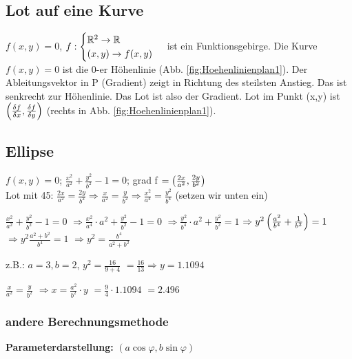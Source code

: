 \renewcommand{\ldate}{2015-11-19}

\subsection{Lot auf eine Kurve}
$f(x,y) = 0$, $f: \begin{cases}
\mathbb{R}^2 \rightarrow \mathbb{R} \\
(x,y) \rightarrow f(x,y)
\end{cases}$ ist ein \glqq Funktionsgebirge\grqq. Die Kurve $f(x,y)=0$ ist die 0-er Höhenlinie (Abb. \ref{fig:Hoehenlinienplan1}). Der Ableitungsvektor in P (Gradient) zeigt in Richtung des steilsten Anstieg. Das ist senkrecht zur Höhenlinie. Das Lot ist also der Gradient. Lot im Punkt (x,y) ist $  \left( \frac{\delta f}{\delta x},\frac{\delta f}{\delta y} \right) $ (rechts in Abb. \ref{fig:Hoehenlinienplan1}).

\subsection{Ellipse}
$f(x,y)=0$; $\frac{x^2}{a^2} + \frac{y^2}{b^2} - 1 = 0$; grad f $= \left( \frac{2x}{a^2}, \frac{2y}{b^2} \right) $ \\
Lot mit 45\grad:
$\frac{2x}{a^2} = \frac{2y}{b^2} \Rightarrow \frac{x}{a^2} = \frac{y}{b^2} \Rightarrow \frac{x^2}{a^4} = \frac{y^2}{b^4}$ (setzen wir unten ein)

$\frac{x^2}{a^2} + \frac{y^2}{b^2} -1 = 0 $
$\Rightarrow \frac{x^2}{a^4} \cdot a^2 + \frac{y^2}{b^2} -1 = 0 $
$\Rightarrow \frac{y^2}{b^4} \cdot a^2 + \frac{y^2}{b^2} = 1 $
$\Rightarrow y^2  \left( \frac{a^2}{b^4} + \frac{1}{b^2} \right)  = 1 $
$\Rightarrow y^2 \frac{a^2 + b^2}{b^4} = 1 $
$\Rightarrow y^2 = \frac{b^4}{a^2 + b^2} $

z.B.: $a=3, b=2$, 
$y^2 = \frac{16}{9 + 4} $
$=\frac{16}{13} \Rightarrow y=1.1094$

$\frac{x}{a^2} = \frac{y}{b^2} $
$\Rightarrow x=\frac{a^2}{b^2} \cdot y$
$=\frac{9}{4} \cdot 1.1094 $
\underline{$=2.496$}

\subsubsection{andere Berechnungsmethode}

\textbf{Parameterdarstellung:} $(a \cos \varphi, b \sin \varphi)$

